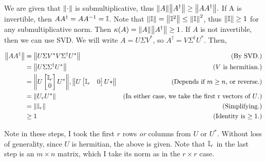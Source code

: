 \partbreak
\begin{solution}

 We are given that $\norm{\cdot}$ is submultiplicative, thus $\norm{A}\norm{A^\dag} \geq \norm{AA^\dag}.$ If A is invertible, then $AA^\dag = AA^{-1} = \mathbb{I}$. Note that $\norm{\mathbb{I}} = \norm{\mathbb{I}^2} \leq \norm{\mathbb{I}}^2$, thus $\norm{\mathbb{I}} \geq 1$ for any submultiplicative norm. Then $\kappa(A) = \norm{A}\norm{A^\dag} \geq 1$. If $A$ is not invertible, then we can use SVD. We will write $A = U\Sigma V^*$, so $A^\dag = V\Sigma^\dag U^*$. Then,

 \alignbreak
 \begin{align}
     \norm{AA^\dag} &= \norm{U\Sigma V^* V \Sigma ^\dag U^*} &\text{(By SVD.)}\nonumber\\
     &= \norm{U\Sigma\Sigma ^\dag U^*} &\text{($V$ is hermitian.)}\nonumber\\
     &= \norm{U\begin{bmatrix}\mathbb{I}_r\\0\end{bmatrix}U^*}, \norm{U\begin{bmatrix}\mathbb{I}_r &0\end{bmatrix}U*} &\text{(Depends if $m \geq n$, or reverse.)}\nonumber\\
     &= \norm{U_rU^*} &\text{(In either case, we take the first r vectors of $U$.)}\nonumber\\
     &= \norm{\mathbb{I}_r} &\text{(Simplifying.)}\nonumber\\
     &\geq 1 &\text{(Identity is $\geq 1$.)}\nonumber
 \end{align}
 \alignbreak

 Note in these steps, I took the first $r$ rows \textit{or} columns from $U$ or $U^*$. Without loss of generality, since $U$ is hermitian, the above is given. Note that $\mathbb{I}_r$ in the last step is an $m \times n$ matrix, which I take its norm as in the $r\times r$ case. 
\end{solution}

\newpage
